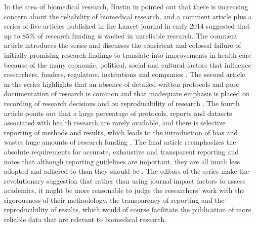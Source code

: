 In the area of biomedical research, Bustin in \cite{bustin2015reproducibility} pointed out that there is increasing concern about the reliability of biomedical research, and a comment article plus a series of five articles published in the Lancet journal in early 2014 suggested that up to 85\% of research funding is wasted in unreliable research. The comment article introduces the series and discusses the consistent and colossal failure of initially promising research findings to translate into improvements in health care because of the many economic, political, social and cultural factors that influence researchers, funders, regulators, institutions and companies \cite{macleod2014biomedical}. 
The second article in the series highlights that an absence of detailed written protocols and poor documentation of
research is common and that inadequate emphasis is placed on recording of research decisions and on reproducibility of research \cite{ioannidis2014increasing}. 
The fourth article points out that a large percentage of protocols, reports and datasets associated with health research are rarely available, and there is selective reporting of methods and results, which leads to the introduction of bias and wastes huge amounts of research funding \cite{chan2014increasing}. The final article reemphasizes the absolute requirements for accurate, exhaustive and transparent reporting and notes that although reporting guidelines are important, they are all much less adopted and adhered to than they should be \cite{glasziou2014reducing}. The editors of the series make the revolutionary suggestion that rather than using journal impact factors to assess academics, it might be more reasonable to judge the researchers' work with the rigorousness of their methodology, the transparency of reporting and the reproducibility of results, which would of course facilitate the publication of more reliable data that are relevant to biomedical research.

